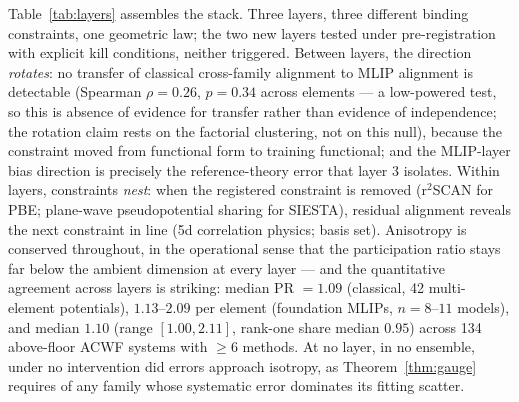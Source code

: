 \documentclass[11pt]{article}
\theoremstyle{remark}
\begin{document}
Table~\ref{tab:layers} assembles the stack. Three layers, three different
binding constraints, one geometric law; the two new layers tested under
pre-registration with explicit kill conditions, neither triggered. Between
layers, the direction \emph{rotates}: no transfer of classical cross-family
alignment to MLIP alignment is detectable (Spearman $\rho = 0.26$, $p = 0.34$
across elements --- a low-powered test, so this is absence of evidence for
transfer rather than evidence of independence; the rotation claim rests on
the factorial clustering, not on this null), because the constraint moved
from functional form to training functional; and the MLIP-layer bias
direction is precisely the reference-theory error that layer 3 isolates.
Within layers, constraints \emph{nest}: when the registered constraint is
removed (r$^2$SCAN for PBE; plane-wave pseudopotential sharing for SIESTA),
residual alignment reveals the next constraint in line (5d correlation
physics; basis set). Anisotropy is conserved throughout, in the operational
sense that the participation ratio stays far below the ambient dimension at
every layer --- and the quantitative agreement across layers is striking:
median PR $= 1.09$ (classical, 42 multi-element potentials), $1.13$--$2.09$
per element (foundation MLIPs, $n = 8$--$11$ models), and median $1.10$
(range $[1.00, 2.11]$, rank-one share median $0.95$) across 134 above-floor
ACWF systems with $\geq 6$ methods. At no layer, in no ensemble, under no
intervention did errors approach isotropy, as Theorem~\ref{thm:gauge}
requires of any family whose systematic error dominates its fitting scatter.

\begin{table}[t]
\centering
\caption{The projection law across one epistemic stack. Each row: an ensemble
of models, the constraint the law identifies as binding, the clustering
evidence (constraint vs.\ implementation), and the registered refutation
condition's status.}
\label{tab:layers}
\end{table}
\end{document}
